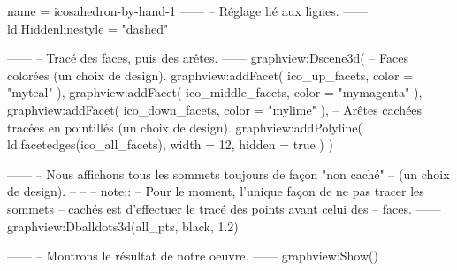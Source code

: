 \documentclass[border = 3pt]{standalone}
\begin{document}
\begin{luadraw*}{name = icosahedron-by-hand-1}
------
-- Réglage lié aux lignes.
------
ld.Hiddenlinestyle = "dashed"

------
-- Tracé des faces, puis des arêtes.
------
graphview:Dscene3d(
-- Faces colorées (un choix de design).
  graphview:addFacet(
    ico_up_facets,
    {color = "myteal"}
  ),
  graphview:addFacet(
    ico_middle_facets,
    {color = "mymagenta"}
  ),
  graphview:addFacet(
    ico_down_facets,
    {color = "mylime"}
  ),
-- Arêtes cachées tracées en pointillés (un choix de design).
  graphview:addPolyline(
    ld.facetedges(ico_all_facets),
    {
      width  = 12,
      hidden = true
    }
  )
)

------
-- Nous affichons tous les sommets toujours de façon "non caché"
-- (un choix de design).
--
--
-- note::
--     Pour le moment, l'unique façon de ne pas tracer les sommets
--     cachés est d'effectuer le tracé des points avant celui des
--     faces.
------
graphview:Dballdots3d(all_pts, black, 1.2)

------
-- Montrons le résultat de notre oeuvre.
------
graphview:Show()
\end{luadraw*}
\end{document}
